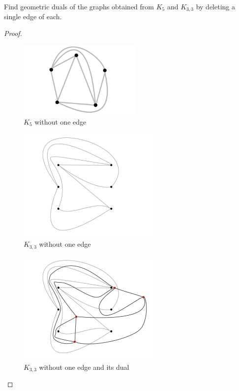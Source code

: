 \prob
{
    Find geometric duals of the graphs obtained from $K_5$ and $K_{3,3}$ by
    deleting a single edge of each.
}
\begin{proof}$\,$\pn
    \begin{figure}[H]
        \begin{center}
        \includegraphics[width=6cm]{Test2/Problem9/PlanarK5WithoutOneEdge.png}
        \end{center}                            
        \caption{$K_5$ without one edge}
        \label{t2:p9_PlanarK5WithoutOneEdge.png}                        
    \end{figure}\pn    
    
    \begin{figure}[H]
        \begin{center}
        \includegraphics[width=7cm]{Test2/Problem9/PlanarK3_3WithoutOneEdge.png}
        \end{center}                            
        \caption{$K_{3,3}$ without one edge}
        \label{t2:p9_PlanarK3_3WithoutOneEdge.png}                        
    \end{figure}\pn    
    
    \begin{figure}[H]
        \begin{center}
        \includegraphics[width=7cm]{Test2/Problem9/PlanarK3_3WithoutOneEdge_and_dual.png}
        \end{center}                            
        \caption{$K_{3,3}$ without one edge and its dual}
        \label{t2:p9_PlanarK3_3WithoutOneEdge_and_dual.png}                        
    \end{figure}\pn    
    

\end{proof}
